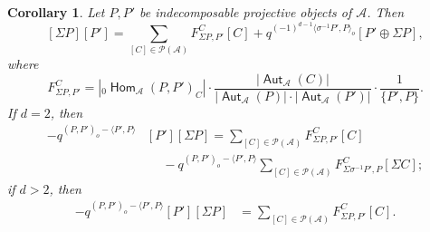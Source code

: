 \documentclass[reqno,12pt,a4paper]{amsart}
\newtheorem{corollary}[theorem]{Corollary}
\theoremstyle{remark}
\theoremstyle{definition}
\newcommand{\opname}[1]{\operatorname{\mathsf{#1}}}
\newcommand{\Hom}{\opname{Hom}}
\newcommand{\Aut}{\opname{Aut}}
\newcommand{\ca}{{\mathcal A}}
\newcommand{\cp}{{\mathcal P}}
\numberwithin{equation}{section}
\begin{document}
\begin{corollary}
\label{cor:commutator-for-neighbouring-pieces-projectives}
Let $P,P'$ be indecomposable projective objects of $\ca$. Then
\[
[\Sigma P][P']=\sum_{[C]\in\cp(\ca)}F_{\Sigma P,P'}^C[C]+q^{(-1)^{d-1}\langle\sigma^{-1} P',P\rangle_o}[P'\oplus\Sigma P],
\]
where
\[
F_{\Sigma P,P'}^C=|{}_0\Hom_\ca(P,P')_C|\cdot\frac{|\Aut_\ca(C)|}{|\Aut_\ca(P)|\cdot |\Aut_\ca(P')|}\cdot\frac{1}{\{P',P\}}.
\]
If $d=2$, then
\begin{align*}
[\Sigma P][P']-q^{(P,P')_o-\langle P',P\rangle}&[P'][\Sigma P]=
\sum_{[C]\in\cp(\ca)}F_{\Sigma P,P'}^C[C]\\
&\hspace{15pt}-q^{(P,P')_o-\langle P',P\rangle}\sum_{[C]\in\cp(\ca)}F_{\Sigma \sigma^{-1}P',P}^C[\Sigma C];
\end{align*}
if $d>2$, then
\begin{align*}
[\Sigma P][P']-q^{(P,P')_o-\langle P',P\rangle}[P'][\Sigma P]&=\sum_{[C]\in\cp(\ca)}F_{\Sigma P,P'}^C[C].
\end{align*}
\end{corollary}
\end{document}
